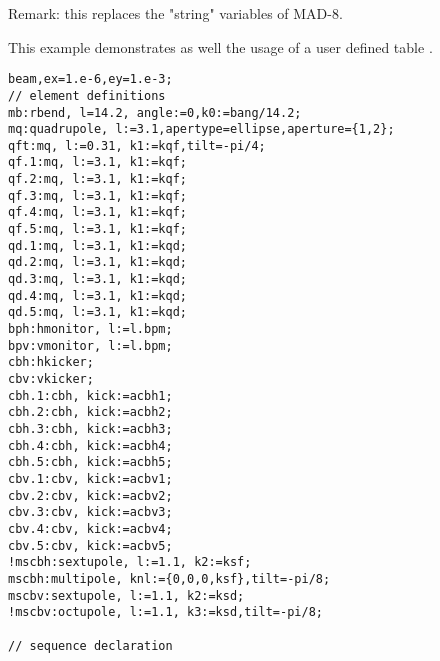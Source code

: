 Remark: this replaces the "string" variables of MAD-8. 

 This example demonstrates as well the usage of a user defined table \label{ucreate}. 
\begin{verbatim}
beam,ex=1.e-6,ey=1.e-3;
// element definitions
mb:rbend, l=14.2, angle:=0,k0:=bang/14.2;
mq:quadrupole, l:=3.1,apertype=ellipse,aperture={1,2};
qft:mq, l:=0.31, k1:=kqf,tilt=-pi/4;
qf.1:mq, l:=3.1, k1:=kqf;
qf.2:mq, l:=3.1, k1:=kqf;
qf.3:mq, l:=3.1, k1:=kqf;
qf.4:mq, l:=3.1, k1:=kqf;
qf.5:mq, l:=3.1, k1:=kqf;
qd.1:mq, l:=3.1, k1:=kqd;
qd.2:mq, l:=3.1, k1:=kqd;
qd.3:mq, l:=3.1, k1:=kqd;
qd.4:mq, l:=3.1, k1:=kqd;
qd.5:mq, l:=3.1, k1:=kqd;
bph:hmonitor, l:=l.bpm;
bpv:vmonitor, l:=l.bpm;
cbh:hkicker;
cbv:vkicker;
cbh.1:cbh, kick:=acbh1;
cbh.2:cbh, kick:=acbh2;
cbh.3:cbh, kick:=acbh3;
cbh.4:cbh, kick:=acbh4;
cbh.5:cbh, kick:=acbh5;
cbv.1:cbv, kick:=acbv1;
cbv.2:cbv, kick:=acbv2;
cbv.3:cbv, kick:=acbv3;
cbv.4:cbv, kick:=acbv4;
cbv.5:cbv, kick:=acbv5;
!mscbh:sextupole, l:=1.1, k2:=ksf;
mscbh:multipole, knl:={0,0,0,ksf},tilt=-pi/8;
mscbv:sextupole, l:=1.1, k2:=ksd;
!mscbv:octupole, l:=1.1, k3:=ksd,tilt=-pi/8;

// sequence declaration


\end{verbatim}
